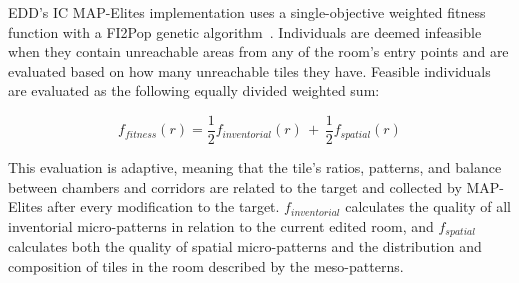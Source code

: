 




EDD's IC MAP-Elites implementation uses a single-objective weighted fitness function with a FI2Pop genetic algorithm~. Individuals are deemed infeasible when they contain unreachable areas from any of the room's entry points and are evaluated based on how many unreachable tiles they have. Feasible individuals are evaluated as the following equally divided weighted sum:  

\begin{equation} 
\label{eq:fitness_func}
f_{fitness}(r) = \frac{1}{2}f_{inventorial}(r) \,+ \, \frac{1}{2}f_{spatial}(r)
\end{equation}

This evaluation is adaptive, meaning that the tile's ratios, patterns, and balance between chambers and corridors are related to the target and collected by MAP-Elites after every modification to the target. $f_{inventorial}$ calculates the quality of all inventorial micro-patterns in relation to the current edited room, and $f_{spatial}$ calculates both the quality of spatial micro-patterns and the distribution and composition of tiles in the room described by the meso-patterns.



